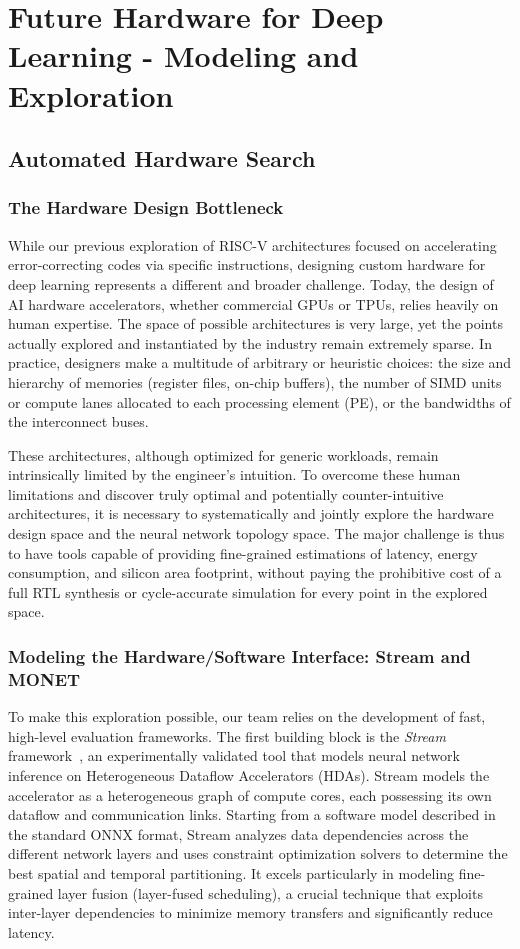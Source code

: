 \documentclass[11pt]{report}
\begin{document}
\section{Future Hardware for Deep Learning - Modeling and Exploration}
\subsection{Automated Hardware Search}

\subsubsection{The Hardware Design Bottleneck}
While our previous exploration of RISC-V architectures focused on accelerating error-correcting codes via specific instructions, designing custom hardware for deep learning represents a different and broader challenge. Today, the design of AI hardware accelerators, whether commercial GPUs or TPUs, relies heavily on human expertise. The space of possible architectures is very large, yet the points actually explored and instantiated by the industry remain extremely sparse. In practice, designers make a multitude of arbitrary or heuristic choices: the size and hierarchy of memories (register files, on-chip buffers), the number of SIMD units or compute lanes allocated to each processing element (PE), or the bandwidths of the interconnect buses.

These architectures, although optimized for generic workloads, remain intrinsically limited by the engineer's intuition. To overcome these human limitations and discover truly optimal and potentially counter-intuitive architectures, it is necessary to systematically and jointly explore the hardware design space and the neural network topology space. The major challenge is thus to have tools capable of providing fine-grained estimations of latency, energy consumption, and silicon area footprint, without paying the prohibitive cost of a full RTL synthesis or cycle-accurate simulation for every point in the explored space.

\subsubsection{Modeling the Hardware/Software Interface: Stream and MONET}
To make this exploration possible, our team relies on the development of fast, high-level evaluation frameworks. The first building block is the \textit{Stream} framework~\cite{symons2024stream}, an experimentally validated tool that models neural network inference on Heterogeneous Dataflow Accelerators (HDAs). Stream models the accelerator as a heterogeneous graph of compute cores, each possessing its own dataflow and communication links. Starting from a software model described in the standard ONNX format, Stream analyzes data dependencies across the different network layers and uses constraint optimization solvers to determine the best spatial and temporal partitioning. It excels particularly in modeling fine-grained layer fusion (layer-fused scheduling), a crucial technique that exploits inter-layer dependencies to minimize memory transfers and significantly reduce latency.
\end{document}
